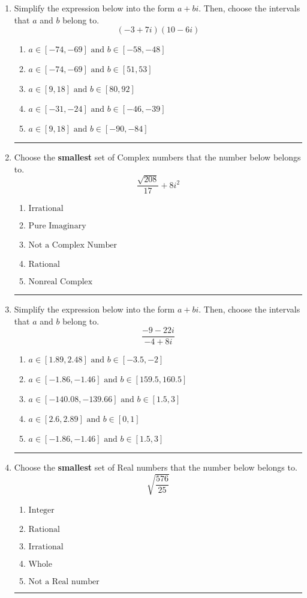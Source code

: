 \documentclass[14pt]{extbook}
\newcommand{\litem}[1]{\item#1\hspace*{-1cm}\rule{\textwidth}{0.4pt}}
\begin{document}
\begin{enumerate}
\litem{
Simplify the expression below into the form $a+bi$. Then, choose the intervals that $a$ and $b$ belong to.\[ (-3 + 7 i)(10 - 6 i) \]\begin{enumerate}[label=\Alph*.]
\item \( a \in [-74, -69] \text{ and } b \in [-58, -48] \)
\item \( a \in [-74, -69] \text{ and } b \in [51, 53] \)
\item \( a \in [9, 18] \text{ and } b \in [80, 92] \)
\item \( a \in [-31, -24] \text{ and } b \in [-46, -39] \)
\item \( a \in [9, 18] \text{ and } b \in [-90, -84] \)

\end{enumerate} }
\litem{
Choose the \textbf{smallest} set of Complex numbers that the number below belongs to.\[ \frac{\sqrt{208}}{17}+8i^2 \]\begin{enumerate}[label=\Alph*.]
\item \( \text{Irrational} \)
\item \( \text{Pure Imaginary} \)
\item \( \text{Not a Complex Number} \)
\item \( \text{Rational} \)
\item \( \text{Nonreal Complex} \)

\end{enumerate} }
\litem{
Simplify the expression below into the form $a+bi$. Then, choose the intervals that $a$ and $b$ belong to.\[ \frac{-9 - 22 i}{-4 + 8 i} \]\begin{enumerate}[label=\Alph*.]
\item \( a \in [1.89, 2.48] \text{ and } b \in [-3.5, -2] \)
\item \( a \in [-1.86, -1.46] \text{ and } b \in [159.5, 160.5] \)
\item \( a \in [-140.08, -139.66] \text{ and } b \in [1.5, 3] \)
\item \( a \in [2.6, 2.89] \text{ and } b \in [0, 1] \)
\item \( a \in [-1.86, -1.46] \text{ and } b \in [1.5, 3] \)

\end{enumerate} }
\litem{
Choose the \textbf{smallest} set of Real numbers that the number below belongs to.\[ \sqrt{\frac{576}{25}} \]\begin{enumerate}[label=\Alph*.]
\item \( \text{Integer} \)
\item \( \text{Rational} \)
\item \( \text{Irrational} \)
\item \( \text{Whole} \)
\item \( \text{Not a Real number} \)


\end{enumerate}}
\end{enumerate}
\end{document}
